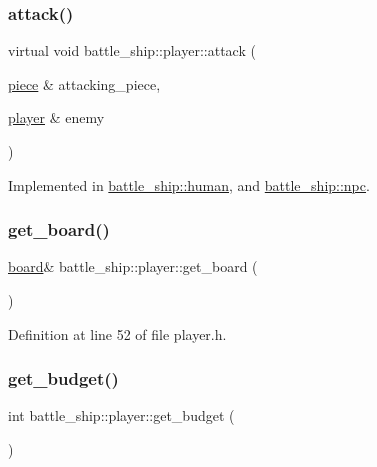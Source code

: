 \subsubsection{\texorpdfstring{attack()}{attack()}}
{\footnotesize\ttfamily virtual void battle\+\_\+ship\+::player\+::attack (\begin{DoxyParamCaption}\item[{\hyperlink{classbattle__ship_1_1piece}{piece} \&}]{attacking\+\_\+piece,  }\item[{\hyperlink{classbattle__ship_1_1player}{player} \&}]{enemy }\end{DoxyParamCaption})\hspace{0.3cm}{\ttfamily [pure virtual]}}



Implemented in \hyperlink{classbattle__ship_1_1human_ad89701f0c4dd688c564b14a015059386}{battle\+\_\+ship\+::human}, and \hyperlink{classbattle__ship_1_1npc_abe6ec844c73c5410c2c4887fd50fac06}{battle\+\_\+ship\+::npc}.

\mbox{\label{classbattle__ship_1_1player_a57dacb55b2c506191d3d8426097c3c6a}} 
\subsubsection{\texorpdfstring{get\+\_\+board()}{get\_board()}}
{\footnotesize\ttfamily \hyperlink{classbattle__ship_1_1board}{board}\& battle\+\_\+ship\+::player\+::get\+\_\+board (\begin{DoxyParamCaption}{ }\end{DoxyParamCaption})\hspace{0.3cm}{\ttfamily [inline]}}



Definition at line 52 of file player.\+h.

\mbox{\label{classbattle__ship_1_1player_ac2e25657d2330845c3770a75d107fef5}} 
\subsubsection{\texorpdfstring{get\+\_\+budget()}{get\_budget()}}
{\footnotesize\ttfamily int battle\+\_\+ship\+::player\+::get\+\_\+budget (\begin{DoxyParamCaption}{ }\end{DoxyParamCaption})\hspace{0.3cm}{\ttfamily [inline]}}



